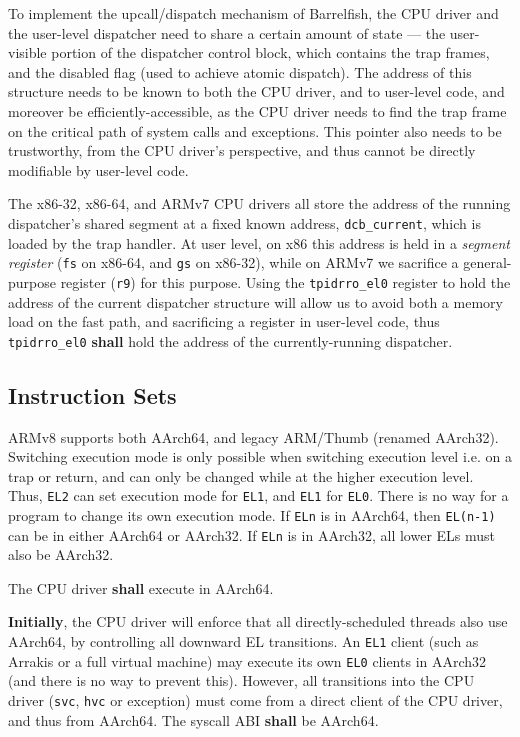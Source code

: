\documentclass[a4paper,twoside]{report}
\begin{document}
To implement the upcall/dispatch mechanism of Barrelfish, the CPU driver and
the user-level dispatcher need to share a certain amount of state --- the
user-visible portion of the dispatcher control block, which contains the trap
frames, and the disabled flag (used to achieve atomic dispatch). The address
of this structure needs to be known to both the CPU driver, and to user-level
code, and moreover be efficiently-accessible, as the CPU driver needs to find
the trap frame on the critical path of system calls and exceptions. This
pointer also needs to be trustworthy, from the CPU driver's perspective, and
thus cannot be directly modifiable by user-level code.

The x86-32, x86-64, and ARMv7 CPU drivers all store the address of the running
dispatcher's shared segment at a fixed known address, \texttt{dcb\_current},
which is loaded by the trap handler. At user level, on x86 this address is
held in a \emph{segment register} (\texttt{fs} on x86-64, and \texttt{gs} on
x86-32), while on ARMv7 we sacrifice a general-purpose register (\texttt{r9})
for this purpose. Using the \texttt{tpidrro\_el0} register to hold the address
of the current dispatcher structure will allow us to avoid both a memory load
on the fast path, and sacrificing a register in user-level code, thus
\texttt{tpidrro\_el0} \textbf{shall} hold the address of the currently-running
dispatcher.

\subsection{Instruction Sets}

ARMv8 supports both AArch64, and legacy ARM/Thumb (renamed AArch32). Switching
execution mode is only possible when switching execution level i.e. on a trap
or return, and can only be changed while at the higher execution level. Thus,
\texttt{EL2} can set execution mode for \texttt{EL1}, and \texttt{EL1} for
\texttt{EL0}. There is no way for a program to change its own execution mode.
If \texttt{ELn} is in AArch64, then \texttt{EL(n-1)} can be in either AArch64
or AArch32. If \texttt{ELn} is in AArch32, all lower ELs must also be AArch32.

The CPU driver \textbf{shall} execute in AArch64.

\textbf{Initially}, the CPU driver will enforce that all directly-scheduled
threads also use AArch64, by controlling all downward EL transitions. An
\texttt{EL1} client (such as Arrakis or a full virtual machine) may execute
its own \texttt{EL0} clients in AArch32 (and there is no way to prevent this).
However, all transitions into the CPU driver (\texttt{svc}, \texttt{hvc} or
exception) must come from a direct client of the CPU driver, and thus from
AArch64. The syscall ABI \textbf{shall} be AArch64.
\end{document}
